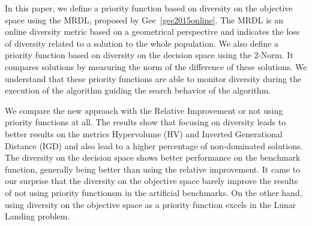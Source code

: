 In this paper, we define a priority function based on diversity on the objective space using the MRDL, proposed by Gee~\ref{gee2015online}. The MRDL is an online diversity metric based on a geometrical perspective and indicates the loss of diversity related to a solution to the whole population. We also define a priority function based on diversity on the decision space using the 2-Norm. It compares solutions by measuring the norm of  the difference of these solutions. We understand that these priority functions are able to monitor diversity during the execution of the algorithm guiding the search behavior of the algorithm.


We compare the new approach with the Relative Improvement or not using priority functions at all. The results show that focusing on diversity leads to better results on the metrics Hypervolume (HV) and Inverted Generational Distance (IGD) and also lead to a higher percentage of non-dominated solutions. The diversity on the decision space shows better performance on the benchmark function,  generally being better than using the relative improvement. It came to our surprise that the diversity on the objective space barely improve the results of not using priority functionsm in the artificial benchmarks. On the other hand, using diversity on the objective space as a priority function excels in the Lunar Landing problem.



